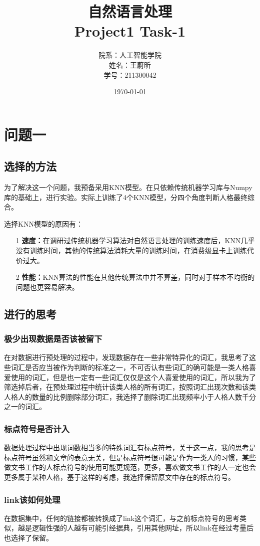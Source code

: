 \documentclass{article}
\title{\huge  自然语言处理\\ \large Project1 Task-1}
\author{院系：人工智能学院\\姓名：王蔚昕\\学号：211300042}
\date{\today}
\begin{document}
	\maketitle
	\newpage
	\tableofcontents
	\newpage
	\section{问题一}
	\subsection{选择的方法}
	为了解决这一个问题，我预备采用KNN模型。在只依赖传统机器学习库与Numpy库的基础上，进行实验。实际上训练了4个KNN模型，分四个角度判断人格最终综合。
	
	选择KNN模型的原因有：
	\begin{enumerate}
		\item[1] \textbf{速度：}在调研过传统机器学习算法对自然语言处理的训练速度后，KNN几乎没有训练时间，其他的传统算法消耗大量的训练时间，在消费级显卡上训练代价过大。
		\item[2] \textbf{性能：}KNN算法的性能在其他传统算法中并不算差，同时对于样本不均衡的问题也更容易解决。
	\end{enumerate}
	\subsection{进行的思考}
	\subsubsection{极少出现数据是否该被留下}
	在对数据进行预处理的过程中，发现数据存在一些非常特异化的词汇，我思考了这些词汇是否应当被作为判断的标准之一，不可否认有些词汇的确可能是一类人格喜爱使用的词汇，但是也一定有一些词汇仅仅是这个人喜爱使用的词汇，所以我为了筛选掉后者，在预处理过程中统计该类人格的所有词汇，按照词汇出现次数和该类人格人的数量的比例删除部分词汇，我选择了删除词汇出现频率小于人格人数千分之一的词汇。
	\subsubsection{标点符号是否计入}
	数据处理过程中出现词数相当多的特殊词汇有标点符号，关于这一点，我的思考是标点符号虽然和文章的表意无关，但是标点符号很可能是作为一类人的习惯，某些做文书工作的人标点符号的使用可能更规范，更多，喜欢做文书工作的人一定也会更多属于某种人格，基于这样的考虑，我选择保留原文中存在的标点符号。
	\subsubsection{link该如何处理}
	在数据集中，任何的链接都被转换成了link这个词汇，与之前标点符号的思考类似，越是逻辑性强的人越有可能引经据典，引用其他网址，所以link在经过考量后也选择了保留。
\end{document}
